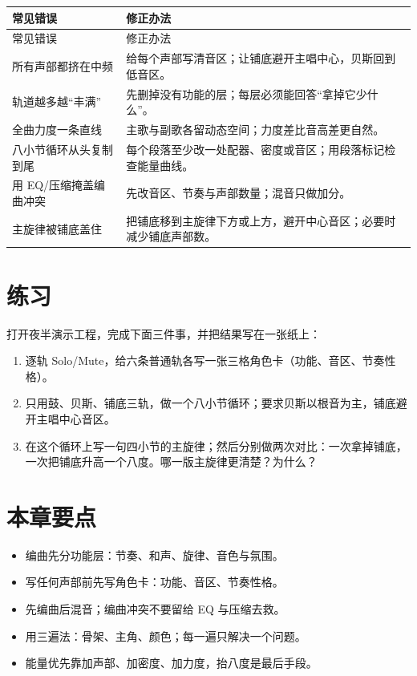 \begin{longtable}{p{}p{}}
\toprule
常见错误 & 修正办法 \\
\midrule
\endfirsthead
\toprule
常见错误 & 修正办法 \\
\midrule
\endhead
所有声部都挤在中频 & 给每个声部写清音区；让铺底避开主唱中心，贝斯回到低音区。 \\
轨道越多越“丰满” & 先删掉没有功能的层；每层必须能回答“拿掉它少什么”。 \\
全曲力度一条直线 & 主歌与副歌各留动态空间；力度差比音高差更自然。 \\
八小节循环从头复制到尾 & 每个段落至少改一处配器、密度或音区；用段落标记检查能量曲线。 \\
用 EQ/压缩掩盖编曲冲突 & 先改音区、节奏与声部数量；混音只做加分。 \\
主旋律被铺底盖住 & 把铺底移到主旋律下方或上方，避开中心音区；必要时减少铺底声部数。 \\
\bottomrule
\end{longtable}

\section{练习}
\label{sec:overview-exercise}

\begin{exercise}
打开夜半演示工程，完成下面三件事，并把结果写在一张纸上：
\begin{enumerate}
\item 逐轨 Solo/Mute，给六条普通轨各写一张三格角色卡（功能、音区、节奏性格）。
\item 只用鼓、贝斯、铺底三轨，做一个八小节循环；要求贝斯以根音为主，铺底避开主唱中心音区。
\item 在这个循环上写一句四小节的主旋律；然后分别做两次对比：一次拿掉铺底，一次把铺底升高一个八度。哪一版主旋律更清楚？为什么？
\end{enumerate}
\end{exercise}

\section{本章要点}
\label{sec:overview-takeaways}

\begin{itemize}
\item 编曲先分功能层：节奏、和声、旋律、音色与氛围。
\item 写任何声部前先写角色卡：功能、音区、节奏性格。
\item 先编曲后混音；编曲冲突不要留给 EQ 与压缩去救。
\item 用三遍法：骨架、主角、颜色；每一遍只解决一个问题。
\item 能量优先靠加声部、加密度、加力度，抬八度是最后手段。
\end{itemize}

